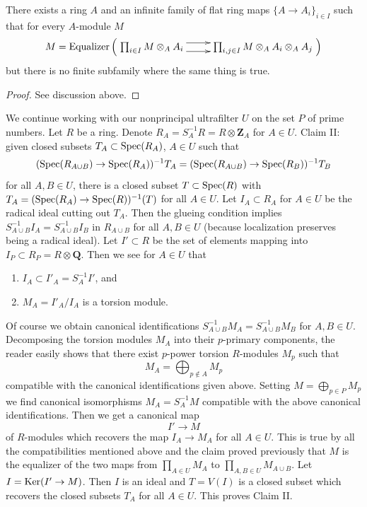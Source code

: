 \begin{lemma}
\label{lemma-non-fpqc-descent}
There exists a ring $A$ and an infinite family of flat ring maps
$\{A \to A_i\}_{i \in I}$ such that for every $A$-module $M$ 
$$
M =
\text{Equalizer}\left(
\xymatrix{
\prod\nolimits_{i \in I} M \otimes_A A_i \ar@<1ex>[r] \ar@<-1ex>[r] &
\prod\nolimits_{i, j \in I} M \otimes_A A_i \otimes_A A_j
}
\right)
$$
but there is no finite subfamily where the same thing is true.
\end{lemma}

\begin{proof}
See discussion above.
\end{proof}

\noindent
We continue working with our nonprincipal ultrafilter $U$ on the set $P$
of prime numbers.
Let $R$ be a ring. Denote $R_A = S_A^{-1}R = R \otimes \mathbf{Z}_A$
for $A \in U$.
Claim II: given closed subsets $T_A \subset \mathop{\mathrm{Spec}}(R_A)$, $A \in U$
such that
$$
(\mathop{\mathrm{Spec}}(R_{A \cup B}) \to \mathop{\mathrm{Spec}}(R_A))^{-1}T_A =
(\mathop{\mathrm{Spec}}(R_{A \cup B}) \to \mathop{\mathrm{Spec}}(R_B))^{-1}T_B
$$
for all $A, B \in U$, there is a closed subset $T \subset \mathop{\mathrm{Spec}}(R)$
with $T_A = (\mathop{\mathrm{Spec}}(R_A) \to \mathop{\mathrm{Spec}}(R))^{-1}(T)$ for all $A \in U$.
Let $I_A \subset R_A$ for $A \in U$ be the radical ideal cutting out $T_A$.
Then the glueing condition implies
$S_{A \cup B}^{-1}I_A = S_{A \cup B}^{-1}I_B$
in $R_{A \cup B}$ for all $A, B \in U$ (because localization preserves
being a radical ideal). Let $I' \subset R$ be the set of elements
mapping into $I_P \subset R_P = R \otimes \mathbf{Q}$.
Then we see for $A \in U$ that
\begin{enumerate}
\item $I_A \subset I'_A = S_A^{-1}I'$, and
\item $M_A = I'_A/I_A$ is a torsion module.
\end{enumerate}
Of course we obtain canonical identifications
$S_{A \cup B}^{-1}M_A = S_{A \cup B}^{-1}M_B$ for $A, B \in U$.
Decomposing the torsion modules $M_A$ into their $p$-primary
components, the reader easily shows that there exist $p$-power torsion
$R$-modules $M_p$ such that
$$
M_A = \bigoplus\nolimits_{p \not \in A} M_p
$$
compatible with the canonical identifications given above.
Setting $M = \bigoplus_{p \in P} M_p$ we find canonical isomorphisms
$M_A = S_A^{-1}M$ compatible with the above canonical identifications.
Then we get a canonical map
$$
I' \longrightarrow M
$$
of $R$-modules which recovers the map $I_A \to M_A$ for all $A \in U$.
This is true by all the compatibilities mentioned above and the
claim proved previously that $M$ is the equalizer of the two
maps from $\prod_{A \in U} M_A$ to $\prod_{A, B \in U} M_{A \cup B}$.
Let $I = \mathop{\mathrm{Ker}}(I' \to M)$. Then $I$ is an ideal and
$T = V(I)$ is a closed subset which
recovers the closed subsets $T_A$ for all $A \in U$. This proves Claim II.


